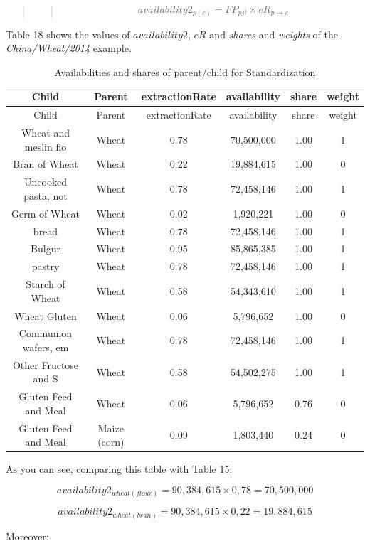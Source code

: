 \documentclass[]{article}
\begin{document}
\begin{quote}
\begin{quote}
\begin{equation}
\label{eq:availability2}
availability2_{p(c)} = FP_{pjt}\times eR_{p\to c}
\end{equation}
\end{quote}
\end{quote}

Table 18 shows the values of \(availability2\), \(eR\) and \emph{shares}
and \emph{weights} of the \emph{China/Wheat/2014} example.

\begin{longtable}[]{@{}cccccc@{}}
\caption{Availabilities and shares of parent/child for
Standardization}\tabularnewline
\toprule
Child & Parent & extractionRate & availability & share &
weight\tabularnewline
\midrule
\endfirsthead
\toprule
Child & Parent & extractionRate & availability & share &
weight\tabularnewline
\midrule
\endhead
Wheat and meslin flo & Wheat & 0.78 & 70,500,000 & 1.00 &
1\tabularnewline
Bran of Wheat & Wheat & 0.22 & 19,884,615 & 1.00 & 0\tabularnewline
Uncooked pasta, not & Wheat & 0.78 & 72,458,146 & 1.00 &
1\tabularnewline
Germ of Wheat & Wheat & 0.02 & 1,920,221 & 1.00 & 0\tabularnewline
bread & Wheat & 0.78 & 72,458,146 & 1.00 & 1\tabularnewline
Bulgur & Wheat & 0.95 & 85,865,385 & 1.00 & 1\tabularnewline
pastry & Wheat & 0.78 & 72,458,146 & 1.00 & 1\tabularnewline
Starch of Wheat & Wheat & 0.58 & 54,343,610 & 1.00 & 1\tabularnewline
Wheat Gluten & Wheat & 0.06 & 5,796,652 & 1.00 & 0\tabularnewline
Communion wafers, em & Wheat & 0.78 & 72,458,146 & 1.00 &
1\tabularnewline
Other Fructose and S & Wheat & 0.58 & 54,502,275 & 1.00 &
1\tabularnewline
Gluten Feed and Meal & Wheat & 0.06 & 5,796,652 & 0.76 &
0\tabularnewline
Gluten Feed and Meal & Maize (corn) & 0.09 & 1,803,440 & 0.24 &
0\tabularnewline
\bottomrule
\end{longtable}

As you can see, comparing this table with Table 15:

\begin{equation}
\label{eq:avExample1}
availability2_{wheat(flour)} = 90,384,615\times 0,78 = 70,500,000
\end{equation}

\begin{equation}
\label{eq:avExample2}
availability2_{wheat(bran)} = 90,384,615\times 0,22 = 19,884,615
\end{equation}

Moreover:
\end{document}
